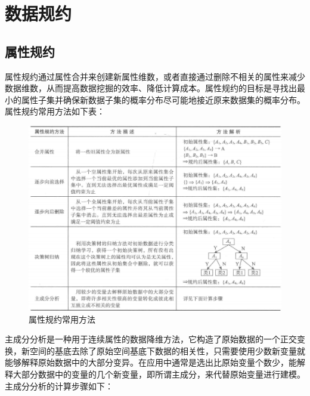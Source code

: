 \documentclass[openany]{progbookcn}
\begin{document}
\section{数据规约}
\subsection{属性规约}
\indent 属性规约通过属性合并来创建新属性维数，或者直接通过删除不相关的属性来减少数据维数，从而提高数据挖掘的效率、降低计算成本。属性规约的目标是寻找出最小的属性子集并确保新数据子集的概率分布尽可能地接近原来数据集的概率分布。属性规约常用方法如下表：
\begin{figure}[H]
\centering
\includegraphics[width=0.8 \textwidth]{figs/chapter23/属性规约常用方法}
\caption{属性规约常用方法}
\end{figure}
\indent 主成分分析是一种用于连续属性的数据降维方法，它构造了原始数据的一个正交变换，新空间的基底去除了原始空间基底下数据的相关性，只需要使用少数新变量就能够解释原始数据中的大部分变异。在应用中通常是选出比原始变量个数少，能解释大部分数据中的变量的几个新变量，即所谓主成分，来代替原始变量进行建模。\\
\indent 主成分分析的计算步骤如下：
\end{document}
